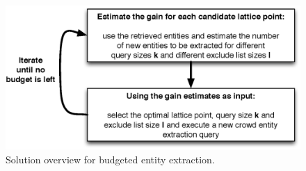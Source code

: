 \begin{figure}
	\begin{center}
	\includegraphics[clip,scale=0.45]{figs/framework.eps}
	\caption{Solution overview for budgeted entity extraction.}
	\label{fig:framework}
	\end{center}
	\vspace{-10pt}
\end{figure}
